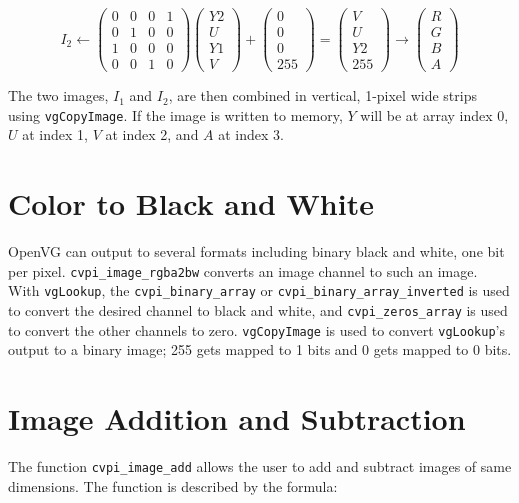 \documentclass[12pt]{report}
\begin{document}
\[I_2 \gets \begin{pmatrix} 0 & 0 & 0 & 1 \\ 0 & 1 & 0 & 0 \\ 1 & 0 & 0 & 0 \\ 0 & 0 & 1 & 0 \end{pmatrix}
\begin{pmatrix} Y2 \\ U \\ Y1 \\ V \end{pmatrix}  + \begin{pmatrix}
0 \\ 0 \\ 0 \\ 255 \end{pmatrix} = \begin{pmatrix}
V \\ U \\ Y2 \\ 255 \end{pmatrix} \to \begin{pmatrix} R \\ G \\ B \\ A \end{pmatrix}
\]

The two images, $I_1$ and $I_2$, are then combined in vertical,
1-pixel wide strips using {\tt vgCopyImage}. If the image is written
to memory, $Y$ will be at array index 0, $U$ at index 1, $V$ at index
2, and $A$ at index 3.

\section{Color to Black and White}
\label{sec-3-5}
OpenVG can output to several formats including binary black and
white, one bit per pixel.  {\tt cvpi\_image\_rgba2bw} converts an
image channel to such an image. With {\tt vgLookup}, the
{\tt cvpi\_binary\_array} or {\tt cvpi\_binary\_array\_inverted} is used to
convert the desired channel to black and white, and
{\tt cvpi\_zeros\_array} is used to convert the other channels to
zero. {\tt vgCopyImage} is used to convert {\tt vgLookup}'s output to
a binary image; 255 gets mapped to 1 bits and 0 gets mapped to 0 bits.

\section{Image Addition and Subtraction}
\label{sec-3-6}
The function {\tt cvpi\_image\_add} allows the user to add and subtract
images of same dimensions. The function is described by the
formula:
\end{document}
